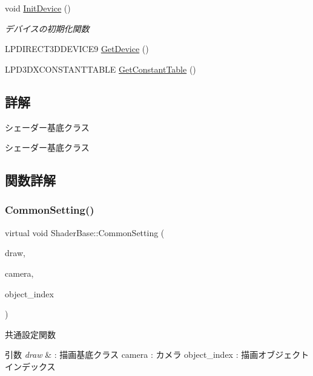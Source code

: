 \begin{DoxyCompactItemize}
void \mbox{\hyperlink{class_shader_base_aaac3419f1fce5bf12973e827daadbf8c}{Init\+Device}} ()
\begin{DoxyCompactList}\small\item\em デバイスの初期化関数 \end{DoxyCompactList}\item 
L\+P\+D\+I\+R\+E\+C\+T3\+D\+D\+E\+V\+I\+C\+E9 \mbox{\hyperlink{class_shader_base_a4601ff3d20f01800ffd676d3db8d9289}{Get\+Device}} ()
\item 
L\+P\+D3\+D\+X\+C\+O\+N\+S\+T\+A\+N\+T\+T\+A\+B\+LE \mbox{\hyperlink{class_shader_base_a85a5c17b56b6ffa29f7784ab42696d7c}{Get\+Constant\+Table}} ()
\end{DoxyCompactItemize}


\subsection{詳解}
シェーダー基底クラス 

シェーダー基底クラス 

\subsection{関数詳解}
\mbox{\label{class_shader_base_aef6fa922223d71fbec81464ebbfaf687}} 
\subsubsection{\texorpdfstring{Common\+Setting()}{CommonSetting()}}
{\footnotesize\ttfamily virtual void Shader\+Base\+::\+Common\+Setting (\begin{DoxyParamCaption}\item[{\mbox{\hyperlink{class_draw_base}{Draw\+Base}} $\ast$}]{draw,  }\item[{\mbox{\hyperlink{class_camera}{Camera}} $\ast$}]{camera,  }\item[{unsigned}]{object\+\_\+index }\end{DoxyParamCaption})\hspace{0.3cm}{\ttfamily [pure virtual]}}



共通設定関数 


\begin{DoxyParams}{引数}
{\em draw} & \+: 描画基底クラス camera \+: カメラ object\+\_\+index \+: 描画オブジェクトインデックス \\
\hline
\end{DoxyParams}


